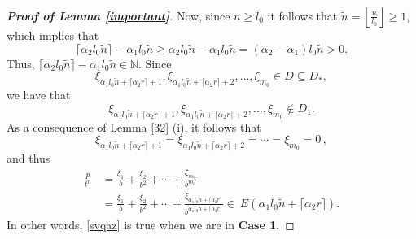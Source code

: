 \documentclass[12pt]{article}
\theoremstyle{definition}
\theoremstyle{remark}
\begin{document}
\begin{proof}[\rm \textbf{Proof of Lemma \ref{important}}]
Now, since  $n\geq l_{0}$ it follows that $\tilde{n}=\left\lfloor\frac{n}{l_{0}}\right\rfloor\geq1$, which implies that
$$\lceil\alpha_{2}l_{0}\tilde{n}\rceil-\alpha_{1}l_{0}\tilde{n}\geq\alpha_{2}l_{0}\tilde{n}-\alpha_{1}l_{0}\tilde{n}=(\alpha_{2}-\alpha_{1})l_{0}\tilde{n}>0.$$
Thus, $\lceil\alpha_{2}l_{0}\tilde{n}\rceil-\alpha_{1}l_{0}\tilde{n}\in\mathbb{N}$. Since $$ \xi_{\alpha_{1}l_{0}\tilde{n}+\lceil\alpha_{2} r\rceil+1},\xi_{\alpha_{1}l_{0}\tilde{n}+\lceil\alpha_{2} r\rceil+2},\ldots,\xi_{m_{0}}\in D\subseteq D_{*},$$ we have that $$ \xi_{\alpha_{1}l_{0}\tilde{n}+\lceil\alpha_{2} r\rceil+1},\xi_{\alpha_{1}l_{0}\tilde{n}+\lceil\alpha_{2} r\rceil+2},\ldots,\xi_{m_{0}}\notin D_{1}.$$ As a consequence of Lemma \ref{32} (i), it follows  that
$$\xi_{\alpha_{1}l_{0}\tilde{n}+\lceil\alpha_{2} r\rceil+1}=\xi_{\alpha_{1}l_{0}\tilde{n}+\lceil\alpha_{2} r\rceil+2}=\cdots=\xi_{m_{0}}=0   \, , $$
and thus
\begin{equation*}
\begin{aligned}
\frac{p}{t^{n}}&=\frac{\xi_{1}}{b}+\frac{\xi_{2}}{b^{2}}+\cdots+\frac{\xi_{ m_{0}}}{b^{m_{0}}}\\[2ex] 
&=\frac{\xi_{1}}{b}+\frac{\xi_{2}}{b^{2}}+\cdots+\frac{\xi_{\alpha_{1}l_{0}\tilde{n}+\lceil\alpha_{2} r\rceil}}{b^{\alpha_{1}l_{0}\tilde{n}+\lceil\alpha_{2} r\rceil}} \in \  E(\alpha_{1}l_{0}\tilde{n} +\lceil\alpha_{2}r\rceil).
\end{aligned}
\end{equation*}
In other words,  \eqref{svqaz} is true when we are in \textbf{Case 1}. 
   



\medskip 


\end{proof}
\end{document}
